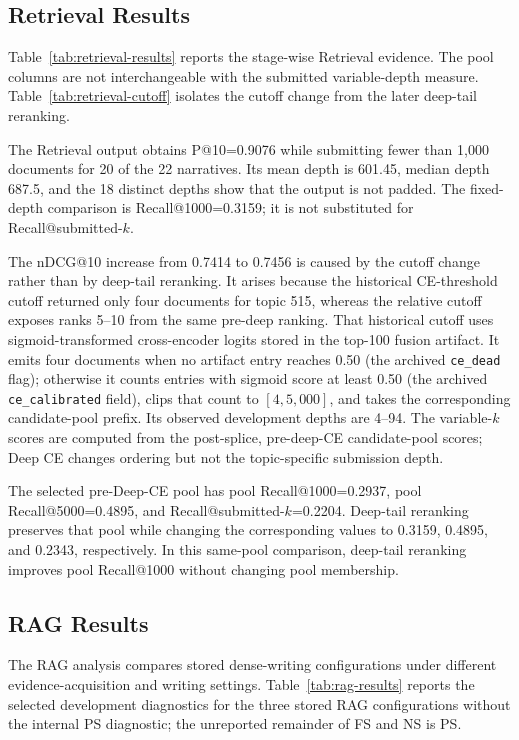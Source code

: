 \subsection{Retrieval Results}

Table~\ref{tab:retrieval-results} reports the stage-wise Retrieval
evidence. The pool columns are not interchangeable with the submitted
variable-depth measure. Table~\ref{tab:retrieval-cutoff} isolates the
cutoff change from the later deep-tail reranking.




The Retrieval output obtains P@10=0.9076 while submitting fewer than
1,000 documents for 20 of the 22 narratives. Its mean
depth is 601.45, median depth 687.5, and the 18 distinct depths show
that the output is not padded. The fixed-depth comparison is
Recall@1000=0.3159; it is not substituted for Recall@submitted-$k$.

The nDCG@10 increase from 0.7414 to 0.7456 is caused by the cutoff
change rather than by deep-tail reranking. It arises because the
historical CE-threshold cutoff returned only four documents for topic 515, whereas
the relative cutoff exposes ranks 5--10 from the same pre-deep ranking.
That historical cutoff uses sigmoid-transformed cross-encoder logits
stored in the top-100 fusion artifact. It emits four documents when no
artifact entry reaches 0.50 (the archived \texttt{ce\_dead} flag);
otherwise it counts entries with sigmoid score at least 0.50 (the
archived \texttt{ce\_calibrated} field), clips that count to
$[4,5{,}000]$, and takes the corresponding candidate-pool prefix. Its observed
development depths are 4--94. The variable-$k$ scores are computed from
the post-splice, pre-deep-CE candidate-pool scores; Deep CE changes ordering but not the
topic-specific submission depth.

The selected pre-Deep-CE pool has pool Recall@1000=0.2937,
pool Recall@5000=0.4895, and Recall@submitted-$k$=0.2204. Deep-tail
reranking preserves that pool while changing the corresponding values
to 0.3159, 0.4895, and 0.2343, respectively.
In this same-pool comparison, deep-tail reranking improves pool
Recall@1000 without changing pool membership.

\subsection{RAG Results}

The RAG analysis compares stored dense-writing configurations under
different evidence-acquisition and writing settings.
Table~\ref{tab:rag-results} reports the
selected development diagnostics for the three stored RAG configurations
without the internal PS diagnostic; the unreported remainder of FS and
NS is PS.

